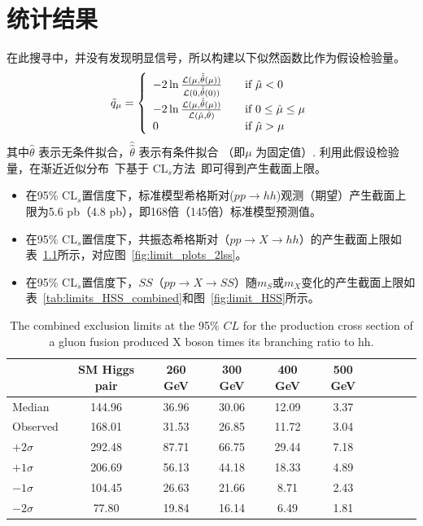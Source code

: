 \chapter{统计结果}\label{chap:statistics}
在此搜寻中，并没有发现明显信号，所以构建以下似然函数比作为假设检验量。
\[ \tilde q_\mu = \left\{
  \begin{array}{l l}
    -2 \ln \frac{\mathcal{L}(\mu,\hat{\hat{\theta}}(\mu))}{\mathcal{L}(0,\hat{\hat{\theta}}(0))} & \quad \text{if $\hat\mu < 0$}\\
    -2 \ln \frac{\mathcal{L}(\mu,\hat{\hat{\theta}}(\mu))}{\mathcal{L}(\hat{\mu},\hat{\theta})} & \quad \text{if $0 \leq \hat\mu \leq \mu$}\\
    0 & \quad \text{if $\hat\mu > \mu$}
  \end{array} \right.\]
\noindent 其中$\hat{\theta}$ 表示无条件拟合，$\hat{\hat{\theta}}$ 表示有条件拟合 （即$\mu$ 为固定值）. 利用此假设检验量，在渐近近似分布~\cite{Cowan:2010js}下基于
CL$_s$方法~\cite{Read:2002hq}即可得到产生截面上限。
\begin{itemize}
  \item 在95\% CL$_s$置信度下，标准模型希格斯对($pp\rightarrow hh$)观测（期望）产生截面上限为5.6 pb（4.8 pb），即168倍（145倍）标准模型预测值。
  \item 在95\% CL$_s$置信度下，共振态希格斯对（$pp\rightarrow X \rightarrow hh$）的产生截面上限如表~\ref{tab:upper_limits_2lss}所示，对应图~\ref{fig:limit_plots_2lss}。
  \item 在95\% CL$_s$置信度下，$SS$（$pp\rightarrow X\rightarrow SS$）随$m_S$或$m_X$变化的产生截面上限如表~\ref{tab:limits_HSS_combined}和图~\ref{fig:limit_HSS}所示。
\end{itemize}

\begin{table}[!ht]
\scriptsize
\begin{center}
\begin{tabular}{l|c|cccccccc}
\hline
\hline
             & SM Higgs pair & 260 GeV  & 300 GeV & 400 GeV &500 GeV   \\
\hline
Median &144.96 &36.96 &30.06 &12.09 &3.37 \\
Observed    &168.01 &31.53 &26.85 &11.72 &3.04 \\
\hline
$+2\sigma$ &292.48 &87.71 &66.75 &29.44 &7.18 \\
$+1\sigma$ &206.69 &56.13 &44.18 &18.33 &4.89 \\
$-1\sigma$ &104.45 &26.63 &21.66 &8.71 &2.43 \\
$-2\sigma$ &77.80 &19.84 &16.14 &6.49 &1.81 \\
\hline
\hline
\end{tabular}
\caption{The combined exclusion limits at the 95$\%$ $CL$ for the production cross section of a gluon fusion produced X boson times its branching ratio to hh.}
\label{tab:upper_limits_2lss}
\end{center}
\end{table}

